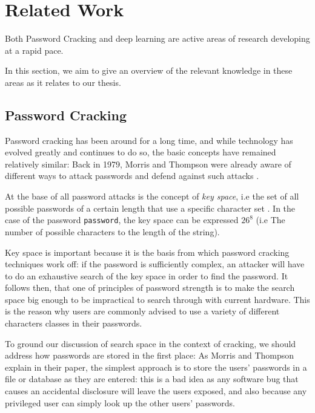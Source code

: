 
\section{Related Work}\label{sec:related_work}
Both Password Cracking and deep learning are active areas of research developing at a rapid pace.

In this section, we aim to give an overview of the relevant knowledge in these areas as it relates to our thesis.

\subsection{Password Cracking}
Password cracking has been around for a long time, and while technology has evolved greatly and continues to do so, the basic concepts have remained relatively similar:
Back in 1979, Morris and Thompson were already aware of different ways to attack passwords and defend against such attacks \cite{Thompson1979}.

At the base of all password attacks is the concept of \emph{key space}, i.e the set of all possible passwords of a certain length that use a specific character set \cite{Thompson1979,hash_cat_mask_attack}. 
In the case of the password \texttt{password}, the key space can be expressed $26^8$ (i.e The number of possible characters to the length of the string).

Key space is important because it is the basis from which password cracking techniques work off: if the password is sufficiently complex, an attacker will have to do an exhaustive search of the key space in order to find the password. 
It follows then, that one of principles of password strength is to make the search space big enough to be impractical to search through with current hardware.
This is the reason why users are commonly advised to use a variety of different characters classes in their passwords.

To ground our discussion of search space in the context of cracking, we should address how passwords are stored in the first place: As Morris and Thompson explain in their paper, the simplest approach is to store the users' passwords in a file or database as they are entered: this is a bad idea as any software bug that causes an accidental disclosure will leave the users exposed, and also because any privileged user can simply look up the other users' passwords.

